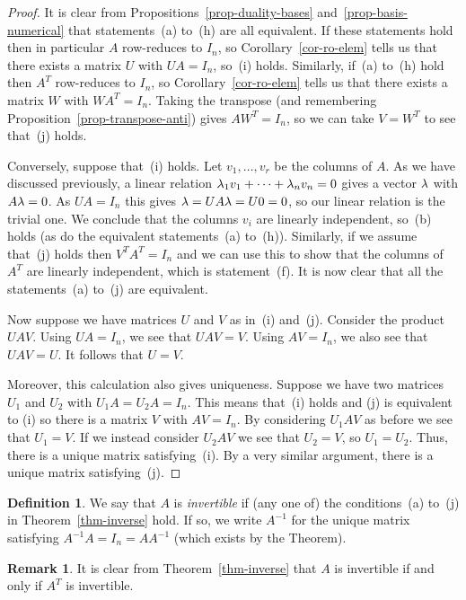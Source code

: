 \documentclass[reqno]{amsart}
\theoremstyle{definition}
\newtheorem{remark}[theorem]{Remark}
\newtheorem{definition}[theorem]{Definition}
\newcommand{\dfn}[1]{\emph{{#1}}\index{#1}}
\begin{document}
\begin{proof}
 It is clear from Propositions~\ref{prop-duality-bases}
 and~\ref{prop-basis-numerical} that statements~(a) to~(h) are all
 equivalent.  If these statements hold then in particular $A$
 row-reduces to $I_n$, so Corollary~\ref{cor-ro-elem} tells us that
 there exists a matrix $U$ with $UA=I_n$, so~(i) holds.  Similarly,
 if~(a) to~(h) hold then $A^T$ row-reduces to $I_n$, so
 Corollary~\ref{cor-ro-elem} tells us that there exists a matrix $W$
 with $WA^T=I_n$.  Taking the transpose (and remembering
 Proposition~\ref{prop-transpose-anti}) gives $AW^T=I_n$, so we can
 take $V=W^T$ to see that~(j) holds.

 Conversely, suppose that~(i) holds.  Let $v_1,\dotsc,v_r$ be the
 columns of $A$.  As we have discussed previously, a linear relation
 $\lambda_1v_1+\dotsb+\lambda_nv_n=0$ gives a vector $\lambda$ with $A\lambda=0$.
 As $UA=I_n$ this gives $\lambda=UA\lambda=U0=0$, so our linear relation is
 the trivial one.  We conclude that the columns $v_i$ are linearly
 independent, so~(b) holds (as do the equivalent statements~(a)
 to~(h)).  Similarly, if we assume that~(j) holds then $V^TA^T=I_n$
 and we can use this to show that the columns of $A^T$ are linearly
 independent, which is statement~(f).  It is now clear that all the
 statements~(a) to~(j) are equivalent.

 Now suppose we have matrices $U$ and $V$ as in~(i) and~(j).  Consider
 the product $UAV$.  Using $UA=I_n$, we see that $UAV=V$.  Using
 $AV=I_n$, we also see that $UAV=U$.  It follows that $U=V$.

 Moreover, this calculation also gives uniqueness.  Suppose we have
 two matrices $U_1$ and $U_2$ with $U_1A=U_2A=I_n$.  This means
 that~(i) holds and (j) is equivalent to (i) so there is a matrix $V$
 with $AV=I_n$.  By considering $U_1AV$ as before we see that
 $U_1=V$.  If we instead consider $U_2AV$ we see that $U_2=V$, so
 $U_1=U_2$.  Thus, there is a unique matrix satisfying~(i).  By a very
 similar argument, there is a unique matrix satisfying~(j).
\end{proof}

\begin{definition}\label{defn-invertible}
 We say that $A$ is \dfn{invertible} if (any one of) the
 conditions~(a) to~(j) in Theorem~\ref{thm-inverse} hold.  If so, we
 write $A^{-1}$ for the unique matrix satisfying $A^{-1}A=I_n=AA^{-1}$
 (which exists by the Theorem).
\end{definition}

\begin{remark}\label{rem-transpose-inverse}
 It is clear from Theorem~\ref{thm-inverse} that $A$ is invertible if
 and only if $A^T$ is invertible.
\end{remark}
\end{document}
